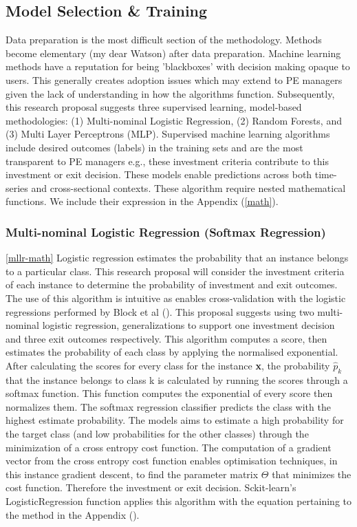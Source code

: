 \documentclass[12pt]{article}
\begin{document}
\subsection{Model Selection \& Training} \label{algorithms}
Data preparation is the most difficult section of the methodology.
Methods become elementary (my dear Watson) after data preparation.
Machine learning methods have a reputation for being 'blackboxes' with decision making opaque to users.
This generally creates adoption issues which may extend to PE managers given the lack of understanding in how the algorithms function.
Subsequently, this research proposal suggests three supervised learning, model-based methodologies: (1) Multi-nominal Logistic Regression, (2) Random Forests, and (3) Multi Layer Perceptrons (MLP).
Supervised machine learning algorithms include desired outcomes (labels) in the training sets and are the most transparent to PE managers e.g., these investment criteria contribute to this investment or exit decision.
These models enable predictions across both time-series and cross-sectional contexts.
These algorithm require nested mathematical functions.
We include their expression in the Appendix (\ref{math}).
\subsubsection{Multi-nominal Logistic Regression (Softmax Regression)} \ref{mllr-math}
Logistic regression estimates the probability that an instance belongs to a particular class.
This research proposal will consider the investment criteria of each instance to determine the probability of investment and exit outcomes.
The use of this algorithm is intuitive as enables cross-validation with the logistic regressions performed by Block et al (\citeyear{BLOCK2019329}).
This proposal suggests using two multi-nominal logistic regression, generalizations to support one investment decision and three exit outcomes respectively.
This algorithm computes a score, then estimates the probability of each class by applying the normalised exponential.
After calculating the scores for every class for the instance \textbf{x}, the probability $\hat{p}_{k}$ that the instance belongs to class k is calculated by running the scores 
through a softmax function. This function computes the exponential of every score then normalizes them.
The softmax regression classifier predicts the class with the highest estimate probability.
The models aims to estimate a high probability for the target class (and low probabilities for the other classes) through the minimization of a cross entropy cost function.
The computation of a gradient vector from the cross entropy cost function enables optimisation techniques, in this instance gradient descent, to find the parameter matrix $\Theta$ that minimizes the cost function.
Therefore the investment or exit decision.
Sckit-learn's LogisticRegression function applies this algorithm with the equation pertaining to the method in the Appendix (\label{mnlr-sr-math}).
\end{document}
